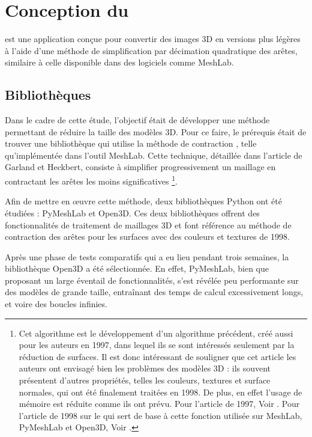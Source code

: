    \section{Conception du \msh}
    \msh est une application conçue pour convertir des images 3D en versions plus légères à l'aide d'une méthode de simplification par décimation quadratique des arêtes, similaire à celle disponible dans des logiciels comme MeshLab.
    
        \subsection{Bibliothèques}
        
        Dans le cadre de cette étude, l'objectif était de développer une méthode permettant de réduire la taille des modèles 3D. Pour ce faire, le prérequis était de trouver une bibliothèque qui utilise la méthode de contraction , telle qu'implémentée dans l'outil MeshLab. Cette technique, détaillée dans l'article de Garland et Heckbert, consiste à simplifier progressivement un maillage en contractant les arêtes les moins significatives \footnote{Cet algorithme est le développement d'un algorithme précédent, créé aussi pour les auteurs en 1997, dans lequel ils se sont intéressés seulement par la réduction de surfaces. Il est donc intéressant de souligner que cet article les auteurs ont envisagé bien les problèmes des modèles 3D : 
        ils souvent présentent d'autres propriétés, telles les couleurs, textures et surface normales, qui ont été finalement traitées en 1998. De plus, en effet l'usage de mémoire est réduite comme ils ont prévu. Pour l'article de 1997, Voir \cite{garland1997surface}. Pour l'article de 1998 sur le  qui sert de base à cette fonction utilisée sur MeshLab, PyMeshLab et Open3D, Voir \cite{garland1998quadric}.}.

        Afin de mettre en œuvre cette méthode, deux bibliothèques Python ont été étudiées : PyMeshLab et Open3D. Ces deux bibliothèques offrent des fonctionnalités de traitement de maillages 3D et font référence au méthode de contraction des arêtes pour les surfaces avec des couleurs et textures de 1998.

        Après une phase de tests comparatifs qui a eu lieu pendant trois semaines, la bibliothèque Open3D a été sélectionnée. En effet, PyMeshLab, bien que proposant un large éventail de fonctionnalités, s'est révélée peu performante sur des modèles de grande taille, entraînant des temps de calcul excessivement longs, et voire des boucles infinies.

